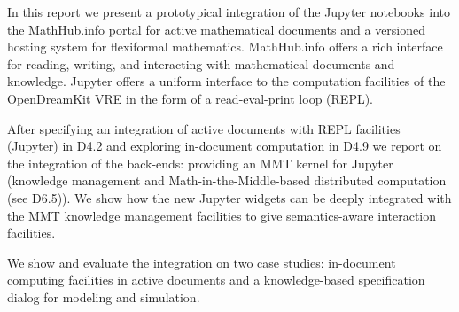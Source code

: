 
  In this report we present a prototypical integration of the Jupyter notebooks into the MathHub.info portal for active mathematical documents and a versioned hosting system for flexiformal mathematics.
  MathHub.info offers a rich interface for reading, writing, and interacting with mathematical documents and knowledge. Jupyter offers a uniform interface to the computation facilities of the OpenDreamKit VRE in the form of a read-eval-print loop (REPL). 

  After specifying an integration of active documents with REPL facilities (Jupyter) in D4.2 and exploring in-document computation in D4.9 we report on the integration of the back-ends: providing an MMT kernel for Jupyter (knowledge management and Math-in-the-Middle-based distributed computation (see D6.5)). We show how the new Jupyter widgets can be deeply integrated with the MMT knowledge management facilities to give semantics-aware interaction facilities.

  We show and evaluate the integration on two case studies: in-document computing facilities in active documents and a knowledge-based specification dialog for modeling and simulation. 

